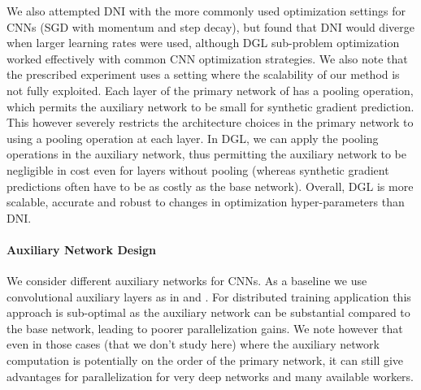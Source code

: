 \documentclass{article}
\begin{document}
We also attempted DNI with the more commonly used optimization settings for CNNs (SGD with momentum and step decay), but found that DNI would diverge when larger learning rates were used, although DGL sub-problem optimization worked effectively with common CNN optimization strategies. We also note that the prescribed experiment uses a setting where the scalability of our method is not fully exploited. Each layer of the primary network of \citep{jaderberg2016decoupled} has a pooling operation, which permits the auxiliary network to be small for synthetic gradient prediction. This however severely restricts the architecture choices in the primary network to using a pooling operation at each layer. In DGL, we can apply the pooling operations in the auxiliary network, thus permitting the auxiliary network to be negligible in cost even for layers without pooling (whereas synthetic gradient predictions  often have to be as costly as the base network). Overall, DGL is more scalable, accurate and  robust to changes in optimization hyper-parameters than DNI. 


\paragraph{Auxiliary Network Design} We consider different auxiliary networks for CNNs. As a baseline we use convolutional auxiliary layers as in \citep{jaderberg2016decoupled} and \citep{shallow}. For distributed training application this approach is sub-optimal as the auxiliary network can be substantial compared to the base network, leading to poorer parallelization gains. We note however that even in those cases (that we don't study here) where the auxiliary network computation is potentially on the order of the primary network, it can still give advantages for parallelization for very deep networks and many available workers. 
\end{document}
